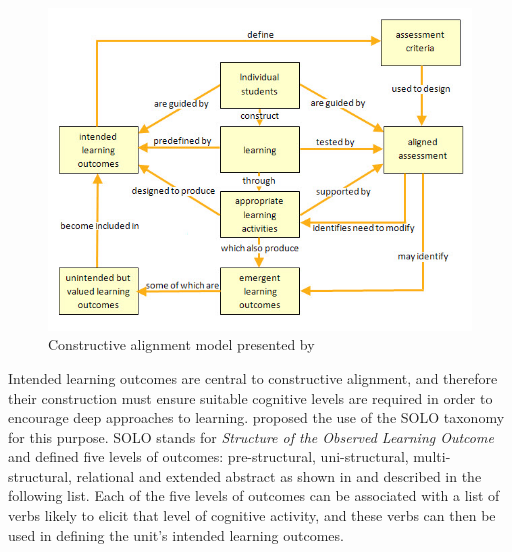 \begin{figure}[htpb]
	\centering 
	\includegraphics[width=\columnwidth]{Houghton_constructive_alignment_1}
	\caption{Constructive alignment model presented by \citet{Houghton:2004}}
	\label{fig:Houghton}
\end{figure}

Intended learning outcomes are central to constructive alignment, and therefore their construction must ensure suitable cognitive levels are required in order to encourage deep approaches to learning. \citet{Biggs:1996c} proposed the use of the SOLO taxonomy \cite{Biggs:1982} for this purpose. SOLO stands for \emph{Structure of the Observed Learning Outcome} and defined five levels of outcomes: pre-structural, uni-structural, multi-structural, relational and extended abstract as shown in  and described in the following list. Each of the five levels of outcomes can be associated with a list of verbs likely to elicit that level of cognitive activity, and these verbs can then be used in defining the unit's intended learning outcomes.

